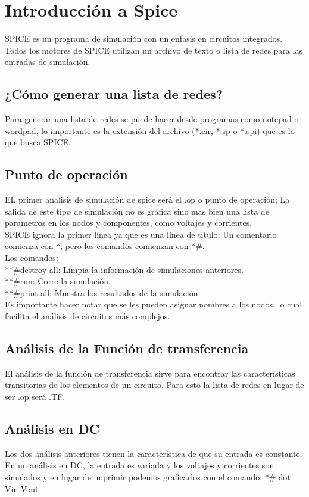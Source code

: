 \documentclass{article}
\begin{document}
	\section*{Introducci\'on a Spice}
	
	SPICE es un programa de simulaci\'on con un enfasis en circuitos integrados. Todos los motores de SPICE utilizan un archivo de texto o lista de redes para las entradas de simulaci\'on.
	
	\subsection*{¿C\'omo generar una lista de redes?}
	Para generar una lista de redes se puede hacer desde programas como notepad o wordpad, lo importante es la extensión del archivo (*.cir, *.sp o *.spi) que es lo que busca SPICE.
	\subsection*{Punto de operación}
	EL primer analisis de simulación de spice será el .op o punto de operación; La salida de este tipo de simulación no es gráfica sino mas bien una lista de parametros en los nodos y componentes, como voltajes y corrientes.
	\\SPICE ignora la primer línea ya que es una linea de titulo; Un comentario comienza con *, pero los comandos comienzan con *\#.
	\\Los comandos:
	\\ **\#destroy all: Limpia la información de simulaciones anteriores.
	\\ **\#run: Corre la simulación.
	\\ **\#print all: Muestra los resultados de la simulación.
	\\Es importante hacer notar que se les pueden asignar nombres a los nodos, lo cual facilita el análisis de circuitos más complejos.
	\subsection*{Análisis de la Función de transferencia}
	El análisis de la función de transferencia sirve para encontrar las características transitorias de los elementos de un circuito. Para esto la lista de redes en lugar de ser .op será .TF.
	\subsection*{Análisis en DC}
	Los dos análisis anteriores tienen la característica de que su entrada es constante. En un análisis en DC, la entrada es variada y los voltajes y corrientes son simulados y en lugar de imprimir podemos graficarlos con el comando:
	*\#plot Vin Vout
	
	
	
	
	
	
	
	
	
	
	
	
	
	
	
\end{document}

